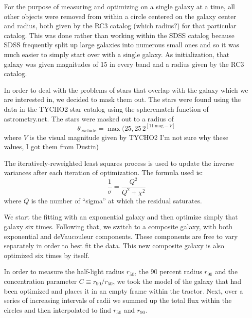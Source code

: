 \documentclass{article}
\newcommand{\units}[1]{\mathrm{#1}}
\renewcommand{\mag}{\units{mag}}
\newcommand{\rfifty}{r_{50}}
\newcommand{\rninety}{r_{90}}
\newcommand{\conc}{C}
\begin{document}
For the purpose of measuring and optimizing on a single galaxy at a
time, all other objects were removed from within a circle centered on
the galaxy center and radius, both given by the RC3 catalog (which
radius?) for that particular catalog. This was done rather than
working within the SDSS catalog because SDSS frequently split up large
galaxies into numerous small ones and so it was much easier to simply
start over with a single galaxy. As initialization, that galaxy was
given magnitudes of 15 in every band and a radius given by the RC3
catalog.

In order to deal with the problems of stars that overlap with the
galaxy which we are interested in, we decided to mask them out. The
stars were found using the data in the TYCHO2 star catalog using the
spherematch function of astrometry.net. The stars were masked out to a
radius of
\begin{equation}
\theta_{\mathrm{exclude}} = \max(25, 25\,2^{[11\,\mag-V]}
\end{equation}
where $V$ is the visual magnitude given by TYCHO2
I'm not sure why these values, I got them from Dustin)

The iteratively-reweighted least squares process is used to update the
inverse variances after each iteration of optimization. The formula
used is: \begin{equation} \frac{1}{\sigma}=\frac{Q^2}{Q^2+\chi^2}
\end{equation}
where $Q$ is the number of ``sigma'' at which the residual saturates.

We start the fitting with an exponential galaxy and then optimize
simply that galaxy six times. Following that, we switch to a composite
galaxy, with both exponential and deVaucouleur components. These
components are free to vary separately in order to best fit the
data. This new composite galaxy is also optimized six times by itself.

In order to measure the half-light radius $\rfifty$, the 90 percent
radius $\rninety$ and the concentration parameter $\conc\equiv
\rninety/\rfifty$, we took the model of the galaxy that had been
optimized and places it in an empty frame within the tractor. Next,
over a series of increasing intervals of radii we summed up the total
flux within the circles and then interpolated to find $\rfifty$ and $\rninety$.
\end{document}
